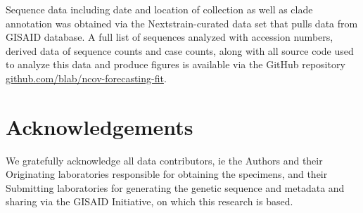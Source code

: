 \documentclass[12pt,oneside,letterpaper]{article}
\begin{document}
Sequence data including date and location of collection as well as clade annotation was obtained via the Nextstrain-curated data set that pulls data from GISAID database.
A full list of sequences analyzed with accession numbers, derived data of sequence counts and case counts, along with all source code used to analyze this data and produce figures is available via the GitHub repository \href{https://github.com/blab/ncov-forecasting-fit}{github.com/blab/ncov-forecasting-fit}.

\section*{Acknowledgements}

We gratefully acknowledge all data contributors, ie the Authors and their Originating laboratories responsible for obtaining the specimens, and their Submitting laboratories for generating the genetic sequence and metadata and sharing via the GISAID Initiative, on which this research is based.



\end{document}
